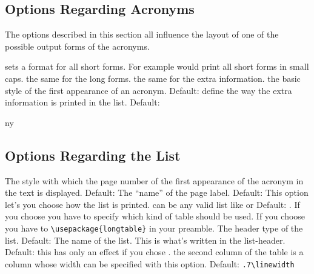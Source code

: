 \documentclass[DIV10,toc=index,toc=bib]{cnpkgdoc}
\begin{document}
\subsection{Options Regarding Acronyms}
The options described in this section all influence the layout of one of the
possible output forms of the acronyms.
\begin{beschreibung}
  sets a format for all short forms. For example
  would print all short forms in small caps.
  the same for the long forms.
  the same for the extra information.
  the basic style of the first
 appearance of an acronym. Default: 
  define the way the extra
 information is printed in the list. Default: 
\end{beschreibung}

\begin{beispiel}
 \acf{ny}
\end{beispiel}

\subsection{Options Regarding the List}
\begin{beschreibung}
  The style with which the page number of
 the first appearance of the acronym in the text is displayed. Default: 
  The ``name'' of the page label. Default: 
  This option let's you choose how the list is
 printed.  can be any valid list like  or 
 Default: .
  If you choose 
 you have to specify which kind of table should be used. If you choose 
 you have to \verb+\usepackage{longtable}+ in your preamble.
 The header type of the list. Default: 
  The name of the list. This is what's written in
 the list-header. Default: 
  this has only an effect if you chose .
 the second column of the table is a  column whose width can be specified
 with this option. Default: \verb+.7\linewidth+
\end{beschreibung}
\end{document}
